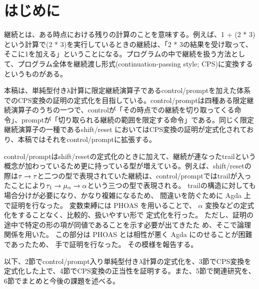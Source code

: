 \section{はじめに}
継続とは、ある時点における残りの計算のことを意味する。例えば、1 + (2 * 3)という計算で(2 * 3)を実行しているときの継続は、「2 * 3の結果を受け取って、そこに1を加える」ということになる。プログラムの中で継続を扱う方法として、プログラム全体を継続渡し形式(continuation-passing style; CPS)に変換するというものがある。

本稿は、単純型付きλ計算に限定継続演算子であるcontrol/prompt\cite{POPL88}を加えた体系でのCPS変換の証明の定式化を目指している。control/promptは四種ある限定継続演算子のうちの一つで、controlが「その時点での継続を切り取ってくる命令」、promptが「切り取られる継続の範囲を限定する命令」である。同じく限定継続演算子の一種であるshift/reset\cite{DF1990,DF1992} においてはCPS変換の証明が定式化されており、本稿ではそれをcontrol/promptに拡張する。

control/promptはshift/resetの定式化のときに加えて、継続が連なったtrailという概念が加わっているため更に持っている型が増えている。例えば、shift/resetの際は${\tau}\rightarrow{\tau}$と二つの型で表現されていた継続は、control/promptではtrailが入ったことにより${\tau_1}\rightarrow{{\mu_{\alpha}}\rightarrow{\alpha}}$という三つの型で表現される。
trailの構造に対しても場合分けが必要になり、かなり複雑になるため、
間違いを防ぐために Agda 上で証明を行なった。
変数束縛には PHOAS \cite{chlipala-phoas} を用いることで、
$\alpha$ 変換などの定式化をすることなく、比較的、扱いやすい形で
定式化を行った。
ただし、証明の途中で特定の形の項が同値であることを示す必要が出てきたた
め、そこで論理関係を用いた。
この部分は PHOAS とは相性が悪く Agda にのせることが困難であったため、
手で証明を行なった。
その模様を報告する。

以下、2節でcontrol/prompt入り単純型付き$\lambda$計算の定式化を、3節でCPS変換を定式化した上で、4節でCPS変換の正当性を証明する。また、5節で関連研究を、6節でまとめと今後の課題を述べる。
